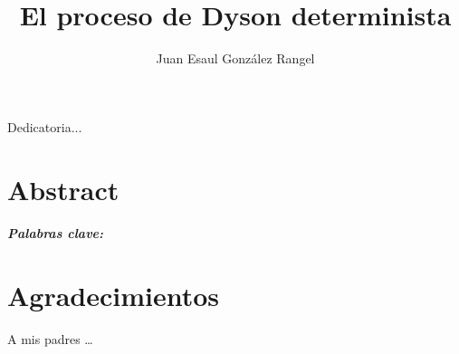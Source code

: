 \documentclass[letterpaper,11pt,twoside]{book}  %
\author{Juan Esaul González Rangel}
\title{El proceso de Dyson determinista}
\begin{document}
\maketitle  %

\thispagestyle{empty}  %

\frontmatter
\chapter*{}
\begin{flushright}%

  
  
  

  Dedicatoria...
  \thispagestyle{empty}
\end{flushright}



\chapter*{Abstract}



\paragraph{Palabras clave:} 

\chapter*{Agradecimientos}

A mis padres \ldots

\tableofcontents
\end{document}
